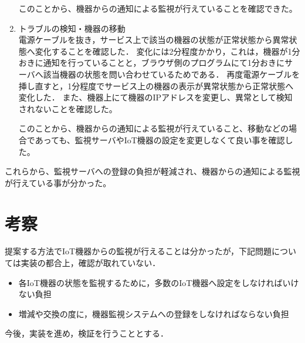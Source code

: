 \begin{enumerate}
このことから、機器からの通知による監視が行えていることを確認できた。
\item トラブルの検知・機器の移動\\
電源ケーブルを抜き，サービス上で該当の機器の状態が正常状態から異常状態へ変化することを確認した．
変化には2分程度かかり，これは，機器が1分おきに通知を行っていることと，ブラウザ側のプログラムにて1分おきにサーバへ該当機器の状態を問い合わせているためである．
再度電源ケーブルを挿し直すと，1分程度でサービス上の機器の表示が異常状態から正常状態へ変化した．
また、機器上にて機器のIPアドレスを変更し、異常として検知されないことを確認した。

このことから、機器からの通知による監視が行えていること、移動などの場合であっても、監視サーバやIoT機器の設定を変更しなくて良い事を確認した。
\end{enumerate}
これらから、監視サーバへの登録の負担が軽減され、機器からの通知による監視が行えている事が分かった。

\section{考察}
提案する方法でIoT機器からの監視が行えることは分かったが，下記問題については実装の都合上，確認が取れていない．
\begin{itemize}
\item 各IoT機器の状態を監視するために，多数のIoT機器へ設定をしなければいけない負担
\item 増減や交換の度に，機器監視システムへの登録をしなければならない負担
\end{itemize}
今後，実装を進め，検証を行うこととする．

